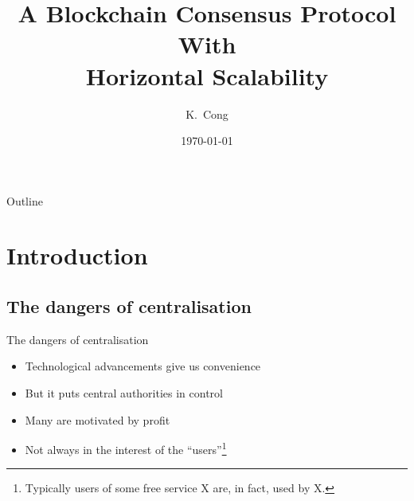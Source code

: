 \documentclass{beamer}
\title{A Blockchain Consensus Protocol With\\Horizontal Scalability}
\author{K.~Cong}
\institute[Delft University of Technology] %
{
  Faculty of Electrical Engineering, Mathematics and Computer Science\\
  Delft University of Technology}
\date{\today}
\begin{document}
\begin{frame}
  \titlepage

\end{frame}

\begin{frame}{Outline}
  \tableofcontents[]
\end{frame}

\section{Introduction}
\subsection{The dangers of centralisation}
\begin{frame}{The dangers of centralisation}
  \begin{itemize}
    \item Technological advancements give us convenience
    \item But it puts central authorities in control
    \item Many are motivated by profit
    \item Not always in the interest of the ``users''\footnote{Typically users of some free service X are, in fact, used by X.}
  \end{itemize}
\end{frame}
\end{document}
